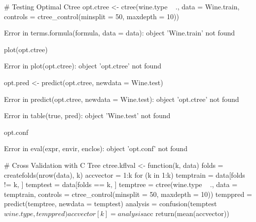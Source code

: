 \documentclass[letterpaper]{article}\usepackage[]{graphicx}\usepackage[]{color}
\begin{document}
\begin{Schunk}
\begin{Sinput}
# Testing Optimal Ctree
opt.ctree <- ctree(wine.type ~ ., data = Wine.train, controls = ctree_control(minsplit = 50, 
    maxdepth = 10))
\end{Sinput}
\begin{Soutput}
Error in terms.formula(formula, data = data): object 'Wine.train' not found
\end{Soutput}
\begin{Sinput}
plot(opt.ctree)
\end{Sinput}
\begin{Soutput}
Error in plot(opt.ctree): object 'opt.ctree' not found
\end{Soutput}
\begin{Sinput}
opt.pred <- predict(opt.ctree, newdata = Wine.test)
\end{Sinput}
\begin{Soutput}
Error in predict(opt.ctree, newdata = Wine.test): object 'opt.ctree' not found
\end{Soutput}
\begin{Soutput}
Error in table(true, pred): object 'Wine.test' not found
\end{Soutput}
\begin{Sinput}
opt.conf
\end{Sinput}
\begin{Soutput}
Error in eval(expr, envir, enclos): object 'opt.conf' not found
\end{Soutput}
\begin{Sinput}
# Cross Validation with C Tree
ctree.kflval <- function(k, data) {
    folds = createfolds(nrow(data), k)
    accvector = 1:k
    for (k in 1:k) {
        temptrain = data[folds != k, ]
        temptest = data[folds == k, ]
        temptree = ctree(wine.type ~ ., data = temptrain, controls = ctree_control(minsplit = 50, 
            maxdepth = 10))
        temppred = predict(temptree, newdata = temptest)
        analysis = confusion(temptest$wine.type, temppred)
        accvector[k] = analysis$acc
    }
    return(mean(accvector))
}


\end{Sinput}
\end{Schunk}
\end{document}
